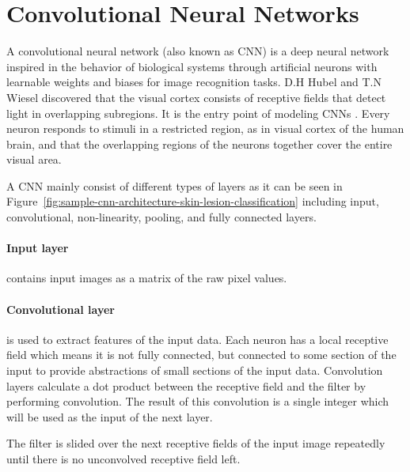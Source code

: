 \section{Convolutional Neural Networks}

    A convolutional neural network (also known as CNN) is a deep neural network inspired in the behavior of biological systems through artificial neurons with learnable weights and biases for image recognition tasks.
    D.H Hubel and T.N Wiesel discovered that the visual cortex consists of receptive fields that detect light in overlapping subregions.
    It is the entry point of modeling CNNs \cite{hubel1968receptive}.
    Every neuron responds to stimuli in a restricted region, as in visual cortex of the human brain, and that the overlapping regions of the neurons together cover the entire visual area.

    

    A CNN mainly consist of different types of layers as it can be seen in Figure~\ref{fig:sample-cnn-architecture-skin-lesion-classification} including input, convolutional, non-linearity, pooling, and fully connected layers.

    \paragraph{Input layer} contains input images as a matrix of the raw pixel values.

    \paragraph{Convolutional layer} is used to extract features of the input data.
        Each neuron has a local receptive field which means it is not fully connected, but connected to some section of the input to provide abstractions of small sections of the input data.
        Convolution layers calculate a dot product between the receptive field and the filter by performing convolution.
        The result of this convolution is a single integer which will be used as the input of the next layer.

        

        The filter is slided over the next receptive fields of the input image repeatedly until there is no unconvolved receptive field left.

